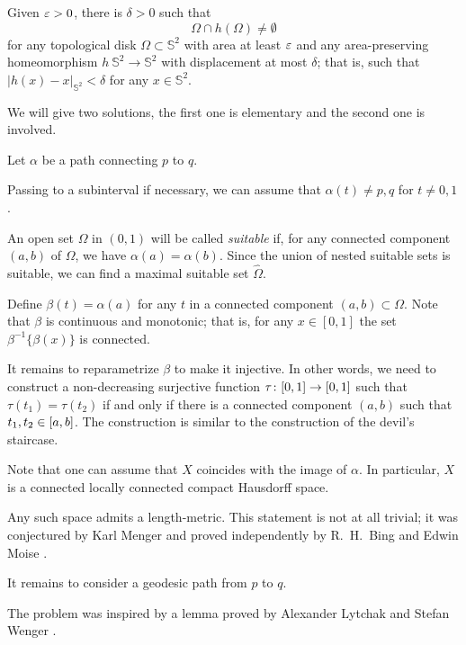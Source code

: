 \begin{pr}
Given $\varepsilon>0$, there is $\delta>0$ such that 
\[\Omega\cap h(\Omega)\ne\emptyset\]
for any topological disk $\Omega\subset \mathbb{S}^2$ with area at least $\varepsilon$
and 
any area-preserving homeomorphism $h\:\mathbb{S}^2\to\mathbb{S}^2$ with displacement at most $\delta$;
that is, such that $|h(x)-x|_{\mathbb{S}^2}<\delta$ for any $x\in \mathbb{S}^2$. 
\end{pr}


We will give two solutions, the first one is elementary and the second one is involved. 

Let $\alpha$ be a path connecting $p$ to $q$.

Passing to a subinterval if necessary,
we can assume that $\alpha(t)\ne p,q$ for $t\ne0,1$.

An open set $\Omega$ in $(0,1)$ will be called {}\emph{suitable} if, for any connected component $(a,b)$ of $\Omega$, we have $\alpha(a)=\alpha(b)$.
Since the union of nested suitable sets is suitable, we can find a maximal suitable set $\hat \Omega$.

Define $\beta(t)=\alpha(a)$ for any $t$ in a connected component $(a,b)\subset\Omega$.
Note that $\beta$ is continuous and monotonic;
that is, for any $x\in [0,1]$ the set $\beta^{-1}\{\beta(x)\}$ is connected.

It remains to reparametrize $\beta$ to make it injective.
In other words, we need to construct a non-decreasing surjective function $\tau\:[0,1]\z\to[0,1]$ such that 
$\tau(t_1)=\tau(t_2)$ if and only if there is a connected component $(a,b)$ such that $t_1,t_2\z\in [a,b]$.
The construction is similar to the construction of the devil's staircase.
\qeds

Note that one can assume that $X$ coincides with the image of $\alpha$.
In particular, $X$ is a connected locally connected compact Hausdorff space.

Any such space admits a length-metric.
This statement is not at all trivial;
it was conjectured by Karl Menger \cite{menger}
and proved independently 
by R.~H.~Bing  \cite{bing-length-0, bing-length-1} 
and Edwin Moise \cite{moise}.

It remains to consider a geodesic path from $p$ to $q$.
\qeds

The problem was inspired by a lemma 
proved by 
Alexander Lytchak
and Stefan Wenger \cite[see 7.13 in][]{lytchak-wenger}.


